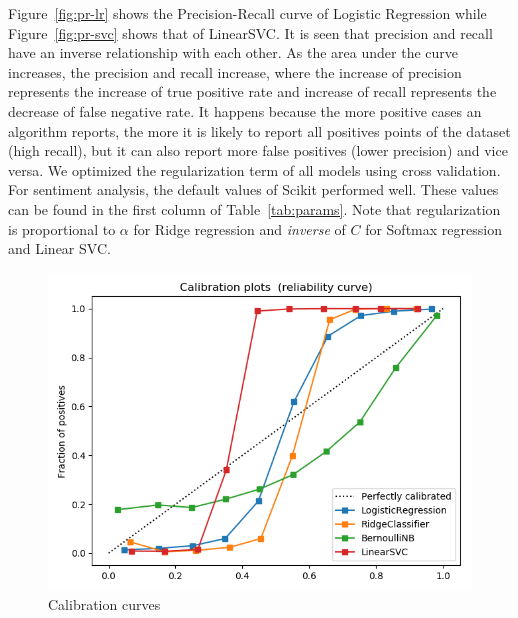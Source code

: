 Figure~\ref{fig:pr-lr} shows the Precision-Recall curve of Logistic Regression while Figure~\ref{fig:pr-svc} shows that of LinearSVC. It is seen that precision and recall have an inverse relationship with each other. As the area under the curve increases, the precision and recall increase, where the increase of precision represents the increase of true positive rate and increase of recall represents the decrease of false negative rate. 
It happens because the more positive cases an algorithm reports, the more it is likely to report all positives points of the dataset (high recall), but it can also report more false positives (lower precision) and vice versa. 
We optimized the regularization term of all models using cross validation. For sentiment analysis, the default values of Scikit performed well. These values can be found in the first column of Table~\ref{tab:params}. Note that regularization is proportional to $\alpha$ for Ridge regression and \textit{inverse} of $C$ for Softmax regression and Linear SVC.

\begin{figure}[tbh]%
\centering
\includegraphics[width=0.9\columnwidth]{figures/calibration.png}%
\caption{Calibration curves}%
\label{fig:calibration}%
\end{figure}

